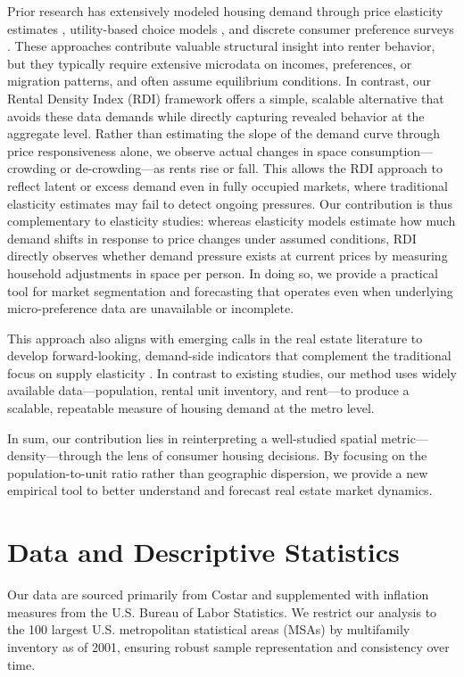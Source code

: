 \documentclass[APA,Times1COL]{WileyNJDv5} %
\begin{document}
Prior research has extensively modeled housing demand through price elasticity estimates \cite{green}, utility-based choice models \cite{rosenthal}, and discrete consumer preference surveys \cite{malpezzi}. These approaches contribute valuable structural insight into renter behavior, but they typically require extensive microdata on incomes, preferences, or migration patterns, and often assume equilibrium conditions. In contrast, our Rental Density Index (RDI) framework offers a simple, scalable alternative that avoids these data demands while directly capturing revealed behavior at the aggregate level. Rather than estimating the slope of the demand curve through price responsiveness alone, we observe actual changes in space consumption—crowding or de-crowding—as rents rise or fall. This allows the RDI approach to reflect latent or excess demand even in fully occupied markets, where traditional elasticity estimates may fail to detect ongoing pressures. Our contribution is thus complementary to elasticity studies: whereas elasticity models estimate how much demand shifts in response to price changes under assumed conditions, RDI directly observes whether demand pressure exists at current prices by measuring household adjustments in space per person. In doing so, we provide a practical tool for market segmentation and forecasting that operates even when underlying micro-preference data are unavailable or incomplete.

This approach also aligns with emerging calls in the real estate literature to develop forward-looking, demand-side indicators that complement the traditional focus on supply elasticity \cite{glaeser2019rethinking}. In contrast to existing studies, our method uses widely available data---population, rental unit inventory, and rent---to produce a scalable, repeatable measure of housing demand at the metro level.

In sum, our contribution lies in reinterpreting a well-studied spatial metric---density---through the lens of consumer housing decisions. By focusing on the population-to-unit ratio rather than geographic dispersion, we provide a new empirical tool to better understand and forecast real estate market dynamics.

\section{Data and Descriptive Statistics}\label{sec3}
Our data are sourced primarily from Costar and supplemented with inflation measures from the U.S. Bureau of Labor Statistics. We restrict our analysis to the 100 largest U.S. metropolitan statistical areas (MSAs) by multifamily inventory as of 2001, ensuring robust sample representation and consistency over time.
\end{document}
